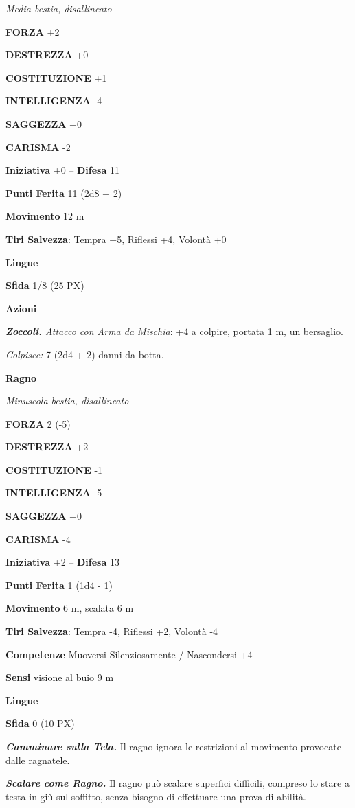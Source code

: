 \begin{multicols}{2}
\textit{Media bestia, disallineato}

\textbf{FORZA} +2

\textbf{DESTREZZA} +0

\textbf{COSTITUZIONE} +1

\textbf{INTELLIGENZA} -4

\textbf{SAGGEZZA} +0

\textbf{CARISMA} -2

\textbf{Iniziativa} +0 -- \textbf{Difesa} 11

\textbf{Punti Ferita} 11 (2d8 + 2)

\textbf{Movimento} 12 m

\textbf{Tiri Salvezza}: Tempra +5, Riflessi +4, Volontà +0

\textbf{Lingue} -

\textbf{Sfida} 1/8 (25 PX)

\textbf{Azioni}

\textit{\textbf{Zoccoli.} Attacco con Arma da Mischia}: +4 a colpire, portata 1 m, un bersaglio.

\textit{Colpisce:} 7 (2d4 + 2) danni da botta.

\medskip\textbf{Ragno}

\textit{Minuscola bestia, disallineato}

\textbf{FORZA} 2 (-5)

\textbf{DESTREZZA} +2

\textbf{COSTITUZIONE} -1

\textbf{INTELLIGENZA} -5

\textbf{SAGGEZZA} +0

\textbf{CARISMA} -4

\textbf{Iniziativa} +2 -- \textbf{Difesa} 13

\textbf{Punti Ferita} 1 (1d4 - 1)

\textbf{Movimento} 6 m, scalata 6 m

\textbf{Tiri Salvezza}: Tempra -4, Riflessi +2, Volontà -4

\textbf{Competenze} Muoversi Silenziosamente / Nascondersi +4

\textbf{Sensi} visione al buio 9 m

\textbf{Lingue} -

\textbf{Sfida} 0 (10 PX)

\textit{\textbf{Camminare sulla Tela.}} Il ragno ignora le restrizioni al movimento provocate dalle ragnatele.

\textit{\textbf{Scalare come Ragno.}} Il ragno può scalare superfici difficili, compreso lo stare a testa in giù sul soffitto, senza bisogno di effettuare una prova di abilità.


\end{multicols}
